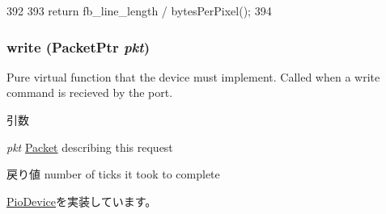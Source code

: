 \begin{DoxyCode}
392                                 {
393         return fb_line_length / bytesPerPixel();
394     }
\end{DoxyCode}
\hypertarget{classHDLcd_a4cefab464e72b5dd42c003a0a4341802}{
\subsubsection[{write}]{ write ({\bf PacketPtr} {\em pkt})}}
\label{classHDLcd_a4cefab464e72b5dd42c003a0a4341802}
Pure virtual function that the device must implement. Called when a write command is recieved by the port. 
\begin{DoxyParams}{引数}
\item[{\em pkt}]\hyperlink{classPacket}{Packet} describing this request \end{DoxyParams}
\begin{DoxyReturn}{戻り値}
number of ticks it took to complete 
\end{DoxyReturn}


\hyperlink{classPioDevice_afe8371668d023bb2516b286e5e399b6f}{PioDevice}を実装しています。


